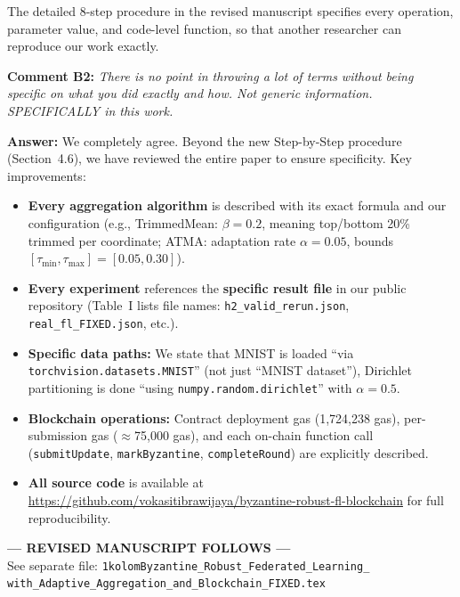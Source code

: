 \documentclass[12pt,a4paper,onecolumn]{article}
\begin{document}
The detailed 8-step procedure in the revised manuscript specifies every operation, parameter value, and code-level function, so that another researcher can reproduce our work exactly.

\bigskip

\noindent\textbf{Comment B2:} \textit{There is no point in throwing a lot of terms without being specific on what you did exactly and how. Not generic information. SPECIFICALLY in this work.}

\noindent\textbf{Answer:} We completely agree. Beyond the new Step-by-Step procedure (Section~4.6), we have reviewed the entire paper to ensure specificity. Key improvements:

\begin{itemize}
    \item \textbf{Every aggregation algorithm} is described with its exact formula and our configuration (e.g., TrimmedMean: $\beta=0.2$, meaning top/bottom 20\% trimmed per coordinate; ATMA: adaptation rate $\alpha=0.05$, bounds $[\tau_{\min},\tau_{\max}]=[0.05, 0.30]$).
    \item \textbf{Every experiment} references the \textbf{specific result file} in our public repository (Table~I lists file names: \texttt{h2\_valid\_rerun.json}, \texttt{real\_fl\_FIXED.json}, etc.).
    \item \textbf{Specific data paths:} We state that MNIST is loaded ``via \texttt{torchvision.datasets.MNIST}'' (not just ``MNIST dataset''), Dirichlet partitioning is done ``using \texttt{numpy.random.dirichlet}'' with $\alpha=0.5$.
    \item \textbf{Blockchain operations:} Contract deployment gas (1,724,238 gas), per-submission gas ($\approx$75,000 gas), and each on-chain function call (\texttt{submitUpdate}, \texttt{markByzantine}, \texttt{completeRound}) are explicitly described.
    \item \textbf{All source code} is available at \url{https://github.com/vokasitibrawijaya/byzantine-robust-fl-blockchain} for full reproducibility.
\end{itemize}

\newpage


\begin{center}
{\Large\textbf{--- REVISED MANUSCRIPT FOLLOWS ---}}\\[10pt]
See separate file: \texttt{1kolomByzantine\_Robust\_Federated\_Learning\_\\with\_Adaptive\_Aggregation\_and\_Blockchain\_FIXED.tex}
\end{center}
\end{document}
